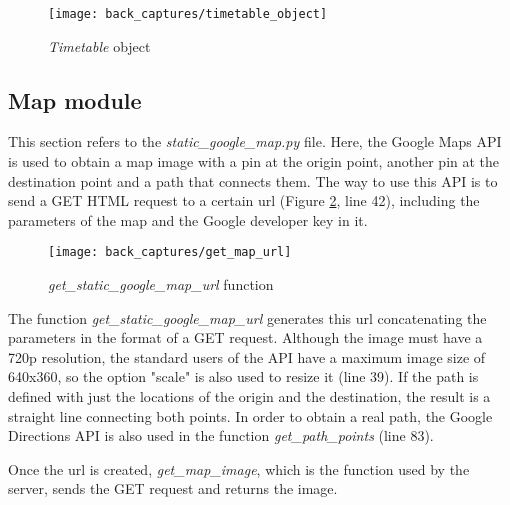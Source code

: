 	\begin{figure}[!ht]
		\vspace{0.5cm}
		\centering
		\texttt{[image: back\_captures/timetable\_object]}
		\caption{\textit{Timetable} object}
		\label{fig:timetable_object}
	\end{figure}
	
	\subsection{Map module}
	\label{subsec:map_module}
	This section refers to the \textit{static{\_}google{\_}map.py} file. Here, the Google Maps API is used to obtain a map image with a pin at the origin point, another pin at the destination point and a path that connects them. The way to use this API is to send a GET HTML request to a certain url (Figure \ref{fig:get_map_url_function}, line 42), including the parameters of the map and the Google developer key in it. 

	\begin{figure}[!ht]
		\centering
		\texttt{[image: back\_captures/get\_map\_url]}
		\caption{\textit{get{\_}static{\_}google{\_}map{\_}url} function}
		\label{fig:get_map_url_function}
	\end{figure}

	The function \textit{get{\_}static{\_}google{\_}map{\_}url} generates this url concatenating the parameters in the format of a GET request. Although the image must have a \gls{720p} resolution, the standard users of the API have a maximum image size of 640x360, so the option "scale" is also used to resize it (line 39). If the path is defined with just the locations of the origin and the destination, the result is a straight line connecting both points. In order to obtain a real path, the Google Directions API is also used in the function \textit{get{\_}path{\_}points} (line 83).

	Once the url is created, \textit{get{\_}map{\_}image}, which is the function used by the server, sends the GET request and returns the image.
	


                                                    
